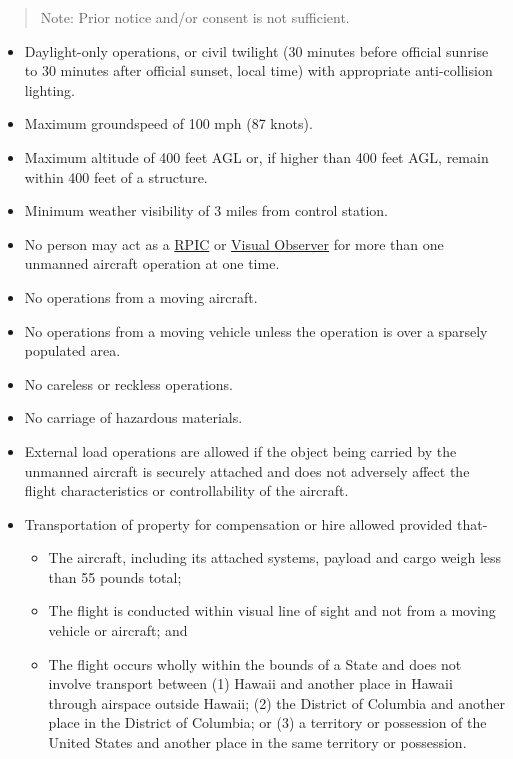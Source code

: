 \documentclass[
]{book}
\providecommand{\tightlist}{%
  \setlength{\itemsep}{0pt}\setlength{\parskip}{0pt}}
\begin{document}
\begin{quote}
Note: Prior notice and/or consent is not sufficient.
\end{quote}

\begin{itemize}
\tightlist
\item
  Daylight-only operations, or civil twilight (30 minutes before official sunrise to 30 minutes after official sunset, local time) with appropriate anti-collision lighting.
\item
  Maximum groundspeed of 100 mph (87 knots).
\item
  Maximum altitude of 400 feet AGL or, if higher than 400 feet AGL, remain within 400 feet of a structure.
\item
  Minimum weather visibility of 3 miles from control station.
\item
  No person may act as a \protect\hyperlink{RPIC}{RPIC} or \protect\hyperlink{VO}{Visual Observer} for more than one unmanned aircraft operation at one time.
\item
  No operations from a moving aircraft.
\item
  No operations from a moving vehicle unless the operation is over a sparsely populated area.
\item
  No careless or reckless operations.
\item
  No carriage of hazardous materials.
\item
  External load operations are allowed if the object being carried by the unmanned aircraft is securely attached and does not adversely affect the flight characteristics or controllability of the aircraft.
\item
  Transportation of property for compensation or hire allowed provided that-

  \begin{itemize}
  \tightlist
  \item
    The aircraft, including its attached systems, payload and cargo weigh less than 55 pounds total;
  \item
    The flight is conducted within visual line of sight and not from a moving vehicle or aircraft; and
  \item
    The flight occurs wholly within the bounds of a State and does not involve transport between (1) Hawaii and another place in Hawaii through airspace outside Hawaii; (2) the District of Columbia and another place in the District of Columbia; or (3) a territory or possession of the United States and another place in the same territory or possession.
  \end{itemize}
\end{itemize}
\end{document}
